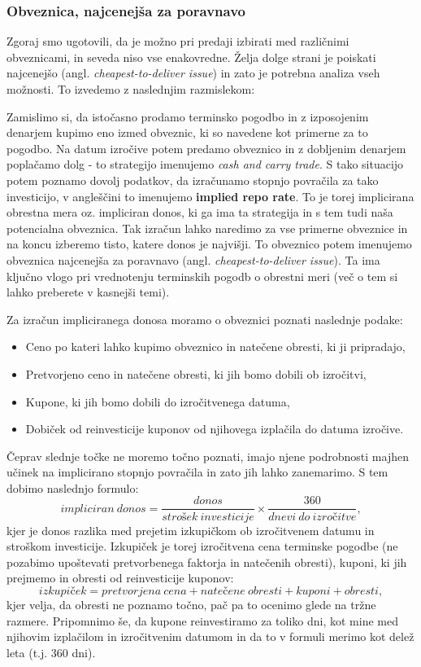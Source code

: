 \documentclass[a4paper, 11pt]{article}
\begin{document}
\subsubsection{Obveznica, najcenejša za poravnavo}
Zgoraj smo ugotovili, da je možno pri predaji izbirati med različnimi obveznicami, in seveda niso
vse enakovredne. Želja dolge strani je poiskati najcenejšo (angl. \textit{cheapest-to-deliver
issue}) in zato je potrebna analiza vseh možnosti. To izvedemo z naslednjim razmislekom:

Zamislimo si, da istočasno prodamo terminsko pogodbo in z izposojenim denarjem kupimo eno 
izmed obveznic, ki so navedene kot primerne za to pogodbo. Na datum izročive potem predamo 
obveznico in z dobljenim denarjem poplačamo dolg - to strategijo imenujemo \textit{cash 
and carry trade}. S tako situacijo potem poznamo dovolj podatkov, da izračunamo stopnjo 
povračila za tako investicijo, v angleščini to imenujemo \textbf{implied repo rate}. To je 
torej implicirana obrestna mera oz. impliciran donos, ki ga ima ta strategija in s tem tudi 
naša potencialna obveznica. Tak izračun lahko naredimo za vse primerne obveznice in na 
koncu izberemo tisto, katere donos je najvišji. To obveznico potem imenujemo obveznica 
najcenejša za poravnavo (angl. \textit{cheapest-to-deliver issue}). Ta ima ključno vlogo
pri vrednotenju terminskih pogodb o obrestni meri (več o tem si lahko preberete v kasnejši temi).

Za izračun impliciranega donosa moramo o obveznici poznati naslednje podake:

\begin{itemize}
    \item Ceno po kateri lahko kupimo obveznico in natečene obresti, ki ji pripradajo,
    \item Pretvorjeno ceno in natečene obresti, ki jih bomo dobili ob izročitvi, 
    \item Kupone, ki jih bomo dobili do izročitvenega datuma,
    \item Dobiček od reinvesticije kuponov od njihovega izplačila do datuma izročive.
\end{itemize}

Čeprav slednje točke ne moremo točno poznati, imajo njene podrobnosti majhen učinek na 
implicirano stopnjo povračila in zato jih lahko zanemarimo. S tem dobimo naslednjo formulo:
%
$$ impliciran\:donos = \frac{donos}{strošek\:investicije} \times
\frac{360}{dnevi\:do\:izročitve}, $$
%
kjer je donos razlika med prejetim izkupičkom ob izročitvenem datumu in stroškom investicije.
Izkupiček je torej izročitvena cena terminske pogodbe (ne pozabimo upoštevati pretvorbenega 
faktorja in natečenih obresti), kuponi, ki jih prejmemo in obresti od reinvesticije kuponov:
%
$$ izkupiček = pretvorjena\:cena + natečene\:obresti + kuponi + obresti, $$
%
kjer velja, da obresti ne poznamo točno, pač pa to ocenimo glede na tržne razmere. Pripomnimo
še, da kupone reinvestiramo za toliko dni, kot mine med njihovim izplačilom in izročitvenim
datumom in da to v formuli merimo kot delež leta (t.j. $360$ dni). 
\end{document}

